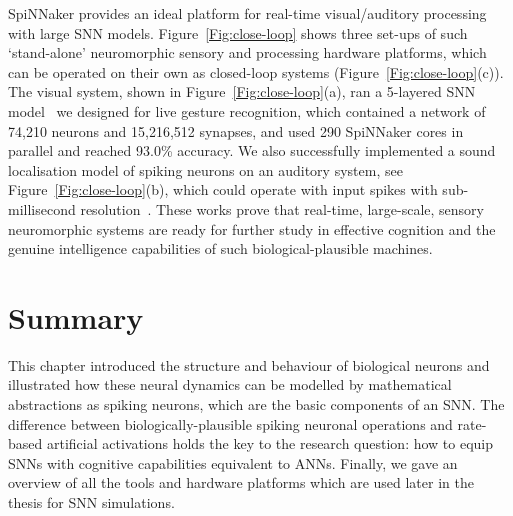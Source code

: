 SpiNNaker provides an ideal platform for real-time visual/auditory processing with large SNN models.
Figure~\ref{Fig:close-loop} shows three set-ups of such `stand-alone' neuromorphic sensory and processing hardware platforms, which can be operated on their own as closed-loop systems (Figure~\ref{Fig:close-loop}(c)).
The visual system, shown in Figure~\ref{Fig:close-loop}(a), ran a 5-layered SNN model~\citep{liu2014real} we designed for live gesture recognition, which contained a network of 74,210 neurons and 15,216,512 synapses, and used 290 SpiNNaker cores in parallel and reached 93.0\% accuracy. 
We also successfully implemented a sound localisation model of spiking neurons on an auditory system, see Figure~\ref{Fig:close-loop}(b), which could operate with input spikes with sub-millisecond resolution~\citep{lagorce2015breaking}.
These works prove that real-time, large-scale, sensory neuromorphic systems are ready for further study in effective cognition and the genuine intelligence capabilities of such biological-plausible machines.

\section{Summary}
This chapter introduced the structure and behaviour of biological neurons and illustrated how these neural dynamics can be modelled by mathematical abstractions as spiking neurons, which are the basic components of an SNN.
The difference between biologically-plausible spiking neuronal operations and rate-based artificial activations holds the key to the research question: how to equip SNNs with cognitive capabilities equivalent to ANNs.
Finally, we gave an overview of all the tools and hardware platforms which are used later in the thesis for SNN simulations.
